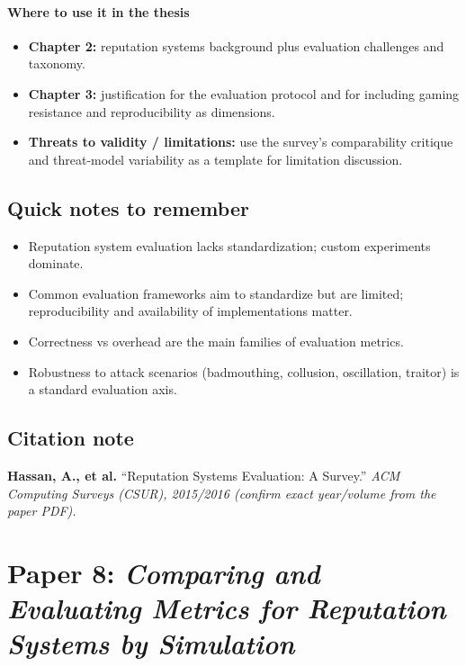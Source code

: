 \documentclass[11pt,a4paper]{article}
\begin{document}
\paragraph{Where to use it in the thesis}
\begin{itemize}[leftmargin=*]
  \item \textbf{Chapter 2:} reputation systems background plus evaluation challenges and taxonomy.
  \item \textbf{Chapter 3:} justification for the evaluation protocol and for including gaming resistance and reproducibility as dimensions.
  \item \textbf{Threats to validity / limitations:} use the survey's comparability critique and threat-model variability as a template for limitation discussion.
\end{itemize}

\subsection{Quick notes to remember}
\begin{itemize}[leftmargin=*]
  \item Reputation system evaluation lacks standardization; custom experiments dominate.
  \item Common evaluation frameworks aim to standardize but are limited; reproducibility and availability of implementations matter.
  \item Correctness vs overhead are the main families of evaluation metrics.
  \item Robustness to attack scenarios (badmouthing, collusion, oscillation, traitor) is a standard evaluation axis.
\end{itemize}

\subsection{Citation note}
\noindent\textbf{Hassan, A., et al.} ``Reputation Systems Evaluation: A Survey.'' \textit{ACM Computing Surveys (CSUR), 2015/2016 (confirm exact year/volume from the paper PDF).}

\newpage
\section{Paper 8: \textit{Comparing and Evaluating Metrics for Reputation Systems by Simulation}}
\end{document}
